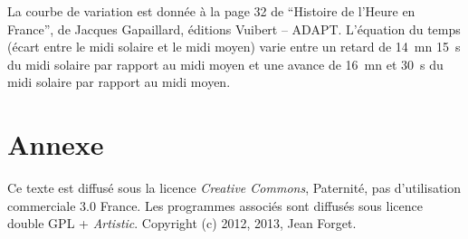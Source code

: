 \documentclass[a4paper]{article}
\newenvironment{texte}{\rmfamily}{}
\begin{document}
\begin{texte}
La courbe de variation est donnée à la page 32 de ``Histoire de l'Heure en France'', 
de Jacques Gapaillard, éditions Vuibert -- ADAPT. L'équation du temps (écart
entre le midi solaire et le midi moyen) varie entre  un retard de 14~mn
15~s du midi solaire par rapport au midi moyen et une avance de 16~mn
et 30~s du midi solaire par rapport au midi moyen.

\section{Annexe}

Ce texte est diffusé sous la licence \textit{Creative Commons},
Paternité, pas d'utilisation commerciale 3.0 France.
Les programmes associés sont diffusés sous licence double GPL + \textit{Artistic}.
Copyright (c) 2012, 2013, Jean Forget.

\end{texte}
\end{document}
